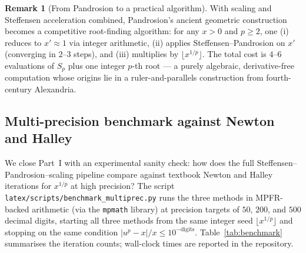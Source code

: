 \documentclass[11pt,a4paper]{article}
\theoremstyle{definition}
\newtheorem{remark}{Remark}[section]
\begin{document}
\begin{remark}[From Pandrosion to a practical algorithm]
With scaling and Steffensen acceleration combined, Pandrosion's ancient geometric construction becomes a competitive root-finding algorithm: for any $x > 0$ and $p \geq 2$, one (i) reduces to $x' \approx 1$ via integer arithmetic, (ii) applies Steffensen--Pandrosion on $x'$ (converging in $2$--$3$ steps), and (iii) multiplies by $\lfloor x^{1/p} \rfloor$. The total cost is $4$--$6$ evaluations of $S_p$ plus one integer $p$-th root --- a purely algebraic, derivative-free computation whose origins lie in a ruler-and-parallels construction from fourth-century Alexandria.
\end{remark}

\subsection{Multi-precision benchmark against Newton and Halley}
\label{sec:benchmark}

We close Part~I with an experimental sanity check: how does the full Steffensen--Pandrosion--scaling pipeline compare against textbook Newton and Halley iterations for $x^{1/p}$ at high precision? The script \texttt{latex/scripts/benchmark\_multiprec.py} runs the three methods in MPFR-backed arithmetic (via the \texttt{mpmath} library) at precision targets of $50$, $200$, and $500$ decimal digits, starting all three methods from the same integer seed $\lfloor x^{1/p} \rfloor$ and stopping on the same condition $|u^p - x|/x \leq 10^{-\text{digits}}$. Table~\ref{tab:benchmark} summarises the iteration counts; wall-clock times are reported in the repository.
\end{document}
